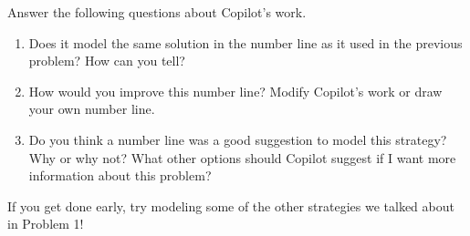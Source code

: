 \documentclass[nooutcomes,noauthor,handout]{ximera}
\begin{document}
\begin{problem}
\begin{explanation}
\end{explanation}	
	
Answer the following questions about Copilot's work.
\begin{enumerate}
\item Does it model the same solution in the number line as it used in the previous problem? How can you tell?
\item How would you improve this number line? Modify Copilot's work or draw your own number line.
\item  Do you think a number line was a good suggestion to model this strategy? Why or why not? What other options should Copilot suggest if I want more information about this problem?

\end{enumerate}



\end{problem}


\begin{problem}
If you get done early, try modeling some of the other strategies we talked about in Problem 1!
\end{problem}
\end{document}
